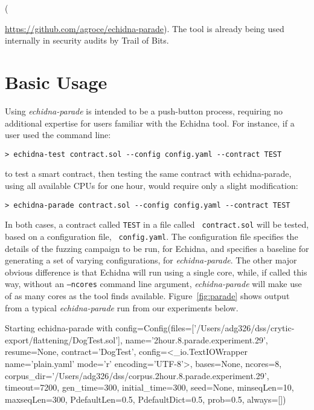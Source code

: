 \documentclass[sigconf,screen]{acmart}
\begin{document}
({\url{https://github.com/agroce/echidna-parade}).  The tool is already being used internally in security audits by Trail of Bits.

\section{Basic Usage}

Using \emph{echidna-parade} is intended to be a push-button process,
requiring no additional expertise for users familiar with the Echidna
tool.  For instance, if a user used the command line:

{\scriptsize
\begin{verbatim}
> echidna-test contract.sol --config config.yaml --contract TEST
\end{verbatim}
  }

\noindent to test a smart contract, then testing the same contract with echidna-parade, using all
available CPUs for one hour, would require only a slight modification:

{\scriptsize
\begin{verbatim}
> echidna-parade contract.sol --config config.yaml --contract TEST
\end{verbatim}
  }

In both cases, a contract called {\tt TEST} in a file called {\tt
  contract.sol} will be tested, based on a configuration file, {\tt
  config.yaml}.  The configuration file specifies the details of the
fuzzing campaign to be run, for Echidna, and specifies a baseline for
generating a set of varying configurations, for
\emph{echidna-parade}.  The other major obvious difference is that Echidna
will run using a single core, while, if called this way, without an
{\tt --ncores} command line argument,
\emph{echidna-parade} will make use of as many cores as the tool
finds available.  Figure~\ref{fig:parade} shows output from a typical
\emph{echidna-parade} run from our experiments below.

\begin{figure*}
  {\scriptsize
    \begin{code}
Starting echidna-parade with
config=Config(files=['/Users/adg326/dss/crytic-export/flattening/DogTest.sol'],
name='2hour.8.parade.experiment.29', resume=None, contract='DogTest',
  config=<\_io.TextIOWrapper name='plain.yaml' mode='r'
  encoding='UTF-8'>, bases=None, ncores=8, corpus\_dir='/Users/adg326/dss/corpus.2hour.8.parade.experiment.29', timeout=7200,
  gen\_time=300, initial\_time=300, seed=None, minseqLen=10, maxseqLen=300, PdefaultLen=0.5, PdefaultDict=0.5,
  prob=0.5, always=[])


\end{code}}
\end{figure*}}
\end{document}
